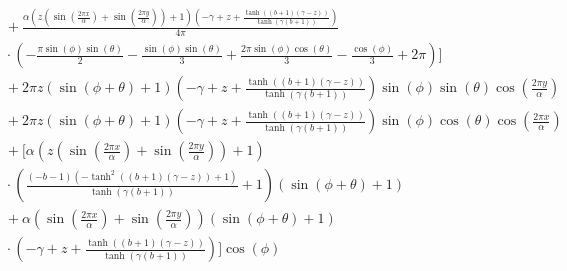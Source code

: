 \begin{align}
  &\quad + \frac{\alpha \left(z \left(\sin{\left (\frac{2 \pi x}{\alpha} \right )} + \sin{\left (\frac{2 \pi y}{\alpha} \right )}\right) + 1\right) \left(- \gamma + z + \frac{\tanh{\left (\left(b + 1\right) \left(\gamma - z\right) \right )}}{\tanh{\left (\gamma \left(b + 1\right) \right )}}\right)}{4 \pi} \nonumber\\
  &\quad \cdot \left(- \frac{\pi \sin{\left (\phi \right )} \sin{\left (\theta \right )}}{2} - \frac{\sin{\left(\phi\right)}\sin{\left(\theta\right)}}{3} + \frac{2 \pi \sin{\left (\phi \right )} \cos{\left (\theta \right )}}{3} - \frac{\cos{\left (\phi \right )}}{3} + 2 \pi\right) \Bigg] \nonumber\\
  &\quad + 2 \pi z \left(\sin{\left (\phi + \theta \right )} + 1\right) \left(- \gamma + z + \frac{\tanh{\left (\left(b + 1\right) \left(\gamma - z\right) \right )}}{\tanh{\left (\gamma \left(b + 1\right) \right )}}\right) \sin{\left (\phi \right )} \sin{\left (\theta \right )} \cos{\left (\frac{2 \pi y}{\alpha} \right )} \nonumber\\
  &\quad + 2 \pi z \left(\sin{\left (\phi + \theta \right )} + 1\right) \left(- \gamma + z + \frac{\tanh{\left (\left(b + 1\right) \left(\gamma - z\right) \right )}}{\tanh{\left (\gamma \left(b + 1\right) \right )}}\right) \sin{\left (\phi \right )} \cos{\left (\theta \right )} \cos{\left (\frac{2 \pi x}{\alpha} \right )} \nonumber\\
  &\quad + \Bigg[\alpha \left(z \left(\sin{\left (\frac{2 \pi x}{\alpha} \right )} + \sin{\left (\frac{2 \pi y}{\alpha} \right )}\right) + 1\right) \nonumber\\
  &\quad \cdot \left(\frac{\left(- b - 1\right) \left(- \tanh^{2}{\left (\left(b + 1\right) \left(\gamma - z\right) \right )} + 1\right)}{\tanh{\left (\gamma \left(b + 1\right) \right )}} + 1\right) %
  \left(\sin{\left (\phi + \theta \right )} + 1\right) \nonumber\\
  &\quad + \alpha \left(\sin{\left (\frac{2 \pi x}{\alpha} \right )} + \sin{\left (\frac{2 \pi y}{\alpha} \right )}\right) \left(\sin{\left (\phi + \theta \right )} + 1\right) \nonumber\\
  &\quad \cdot \left(- \gamma + z + \frac{\tanh{\left (\left(b + 1\right) \left(\gamma - z\right) \right )}}{\tanh{\left (\gamma \left(b + 1\right) \right )}}\right)\Bigg] \cos{\left (\phi \right )}
  \label{eqn:mms_source_expr}
\end{align}


